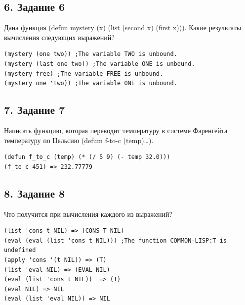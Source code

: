 \subsection*{6. Задание 6}
Дана функция (defun mystery (x) (list (second x) (first x))). Какие результаты вычисления следующих выражений?

\begin{lstlisting}
(mystery (one two)) ;The variable TWO is unbound.
(mystery (last one two)) ;The variable ONE is unbound.
(mystery free) ;The variable FREE is unbound.
(mystery one 'two)) ;The variable ONE is unbound.
\end{lstlisting}

\subsection*{7. Задание 7}
Написать функцию, которая переводит температуру в системе Фаренгейта
температуру по Цельсию (defum f-to-c (temp)…).
\begin{lstlisting}
(defun f_to_c (temp) (* (/ 5 9) (- temp 32.0)))
(f_to_c 451) => 232.77779
\end{lstlisting}

\subsection*{8. Задание 8}
Что получится при вычисления каждого из выражений?
\begin{lstlisting}
(list 'cons t NIL) => (CONS T NIL)
(eval (eval (list 'cons t NIL))) ;The function COMMON-LISP:T is undefined
(apply 'cons '(t NIL)) => (T)
(list 'eval NIL) => (EVAL NIL)
(eval (list 'cons t NIL))  => (T)
(eval NIL) => NIL
(eval (list 'eval NIL)) => NIL
\end{lstlisting}

